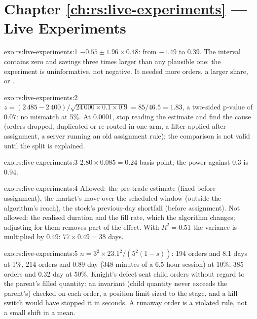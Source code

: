 \section*{Chapter \ref{ch:rs:live-experiments} --- Live Experiments}

\begin{solution}{exo:rs:live-experiments:1}
$-0.55 \pm 1.96 \times 0.48$: from $-1.49$ to 0.39. The interval contains zero and savings three times larger than any plausible one: the experiment is
uninformative, not negative. It needed more orders, a larger share, or .
\end{solution}

\begin{solution}{exo:rs:live-experiments:2}
$z = (2\,485 - 2\,400)/\sqrt{24\,000 \times 0.1 \times 0.9} = 85/46.5 = 1.83$, a two-sided p-value of 0.07: no mismatch at 5\%. At 0.0001, stop reading the
estimate and find the cause (orders dropped, duplicated or re-routed in one arm, a filter applied after assignment, a server running an old assignment rule);
the comparison is not valid until the split is explained.
\end{solution}

\begin{solution}{exo:rs:live-experiments:3}
$2.80 \times 0.085 = 0.24$ basis point; the power against 0.3 is 0.94.
\end{solution}

\begin{solution}{exo:rs:live-experiments:4}
Allowed: the pre-trade estimate (fixed before assignment), the market's move over the scheduled window (outside the algorithm's reach), the stock's
previous-day shortfall (before assignment). Not allowed: the realised duration and the fill rate, which the algorithm changes; adjusting for them removes part
of the effect. With $R^2 = 0.51$ the variance is multiplied by 0.49: $77 \times 0.49 = 38$ days.
\end{solution}

\begin{solution}{exo:rs:live-experiments:5}
$n = 3^2 \times 23.1^2/(5^2(1-s))$: 194 orders and 8.1 days at 1\%, 214 orders and 0.89 day (348 minutes of a 6.5-hour session) at 10\%, 385 orders and
0.32 day at 50\%. Knight's defect sent child orders without regard to the parent's filled quantity: an invariant (child quantity never exceeds the parent's)
checked on each order, a position limit sized to the stage, and a kill switch would have stopped it in seconds. A runaway order is a violated rule, not a
small shift in a mean.
\end{solution}


